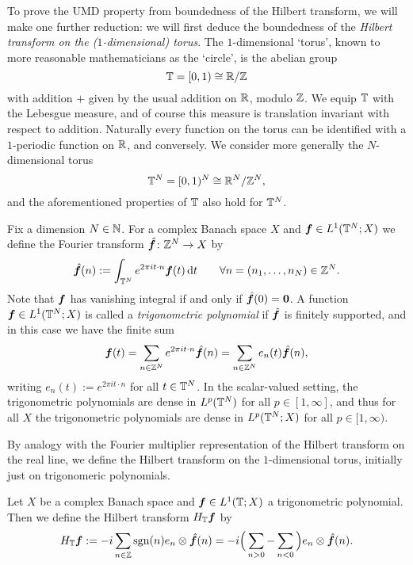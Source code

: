   To prove the UMD property from boundedness of the Hilbert transform, we will make one further reduction: we will first deduce the boundedness of the \emph{Hilbert transform on the ($1$-dimensional) torus}.
  The $1$-dimensional `torus', known to more reasonable  mathematicians as the `circle', is the abelian group
  \begin{equation*}
    \mathbb{T} = [0,1) \cong \mathbb{R} / \mathbb{Z}
  \end{equation*}
  with addition $+$ given by the usual addition on $\mathbb{R}$, modulo $\mathbb{Z}$.
  We equip $\mathbb{T}$ with the Lebesgue measure, and of course this measure is translation invariant with respect to addition.
  Naturally every function on the torus can be identified with a $1$-periodic function on $\mathbb{R}$, and conversely.
  We consider more generally the $N$-dimensional torus
  \begin{equation*}
    \mathbb{T}^{N} = [0,1)^{N} \cong \mathbb{R}^{N} / \mathbb{Z}^{N}, 
  \end{equation*}
  and the aforementioned properties of $\mathbb{T}$ also hold for $\mathbb{T}^{N}$.

  Fix a dimension $N \in \mathbb{N}$.
  For a complex Banach space $X$ and $\bm{f} \in L^1(\mathbb{T}^{N};X)$ we define the Fourier transform $\hat{\bm{f}} \colon \mathbb{Z}^{N} \rightarrow X$ by
  \begin{equation*}
    \hat{\bm{f}}(n) := \int_{\mathbb{T}^{N}} e^{2\pi i t \cdot n} \bm{f}(t) \, \mathrm{d} t \qquad \forall n = (n_1,\ldots,n_N) \in \mathbb{Z}^{N}.
  \end{equation*}
  Note that $\bm{f}$ has vanishing integral if and only if $\hat{\bm{f}}(0) = \bm{0}$.
  A function $\bm{f} \in L^1(\mathbb{T}^{N};X)$ is called a \emph{trigonometric polynomial} if $\hat{\bm{f}}$ is finitely supported, and in this case we have the finite sum
  \begin{equation}\label{eq:trigpoly}
    \bm{f}(t) = \sum_{n \in \mathbb{Z}^{N}} e^{2\pi i t \cdot n} \hat{\bm{f}}(n) = \sum_{n \in \mathbb{Z}^{N}} e_{n}(t) \hat{\bm{f}}(n),
  \end{equation}
  writing $e_{n}(t) := e^{2\pi i t \cdot n}$ for all $t \in \mathbb{T}^{N}$.
  In the scalar-valued setting, the trigonometric polynomials are dense in $L^p(\mathbb{T}^{N})$ for all $p \in [1,\infty]$, and thus for all $X$ the trigonometric polynomials are dense in $L^p(\mathbb{T}^{N};X)$ for all $p \in [1,\infty)$.

  By analogy with the Fourier multiplier representation of the Hilbert transform on the real line, we define the Hilbert transform on the $1$-dimensional torus, initially just on trigonomeric polynomials.
  \begin{defn}
    Let $X$ be a complex Banach space and $\bm{f} \in L^1(\mathbb{T};X)$ a trigonometric polynomial.
    Then we define the Hilbert transform $H_{\mathbb{T}}\bm{f}$ by
    \begin{equation*}
      H_{\mathbb{T}} \bm{f} := -i \sum_{n \in \mathbb{Z}} \operatorname{sgn}(n) e_{n} \otimes \hat{\bm{f}}(n) = -i \Big( \sum_{n > 0} - \sum_{n < 0} \Big) e_{n} \otimes \hat{\bm{f}}(n).
    \end{equation*}  
  \end{defn}

